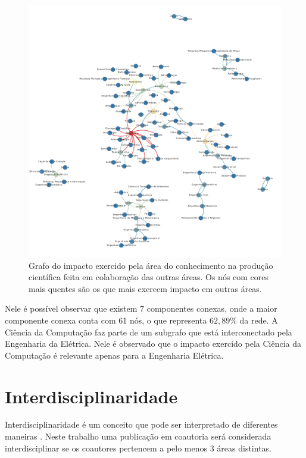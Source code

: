 \begin{figure}[htpb]
  \centering
  \includegraphics[width=1\textwidth]{figuras/resultados-grafo-impacto}
  \caption{Grafo do impacto exercido pela área do conhecimento na produção científica feita em colaboração das outras áreas. Os nós com cores mais quentes são os que mais exercem impacto em outras áreas.}
  \label{fig:grafoimpacto}
\end{figure}

Nele é possível observar que existem $7$ componentes conexas, onde a maior componente conexa conta com 61 nós, o que representa $62,89$\% da rede. A Ciência da Computação faz parte de um subgrafo que está interconectado pela Engenharia da Elétrica. Nele é observado que o impacto exercido pela Ciência da Computação é relevante apenas para a Engenharia Elétrica.

\section{Interdisciplinaridade}

Interdisciplinaridade é um conceito que pode ser interpretado de diferentes maneiras \cite{rousseau2019knowledge}. Neste trabalho uma publicação em coautoria será considerada interdisciplinar se os coautores pertencem a pelo menos 3 áreas distintas.

